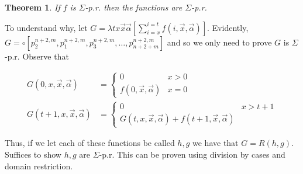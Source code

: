 \documentclass[a4paper, 12pt]{article}
\newtheorem{theorem}{Theorem}
\newtheorem{theorem}{Theorem}
\begin{document}
\begin{theorem}
    If $f$ is $\Sigma$-p.r. then the functions are $\Sigma$-p.r.
\end{theorem}

To understand why, let $G = \lambda tx \overrightarrow{x}\overrightarrow{\alpha}
\left[\sum_{i=x}^{i=t} f(i, \overrightarrow{x},
\overrightarrow{\alpha})\right]$. Evidently, $G = \circ \left[ p_2^{n+2, m},
p_1^{n + 2, m}, p_3^{n+2, m}, \ldots, p_{n+2+m}^{n+2, m} \right] $ and so we
only need to prove $G$ is $\Sigma$-p.r. Observe that 

\begin{align*}
    G(0, x, \overrightarrow{x}, \overrightarrow{\alpha}) &= \begin{cases}
        0 & x > 0 \\ 
        f(0, \overrightarrow{x}, \overrightarrow{\alpha}) & x = 0
    \end{cases} \\ 
    G(t + 1, x, \overrightarrow{x}, \overrightarrow{\alpha}) &= \begin{cases}
        0 & x > t  +1 \\ 
        G(t, x, \overrightarrow{x}, \overrightarrow{\alpha}) + f(t+1,
        \overrightarrow{x}, \overrightarrow{\alpha})
    \end{cases}
\end{align*}

Thus, if we let each of these functions be called $h, g$ we have that $G = R(h,
g)$. Suffices to show $h, g$ are $\Sigma$-p.r. This can be proven using
division by cases and domain restriction.
\end{document}
